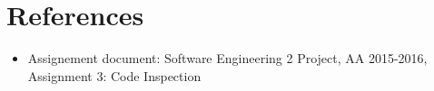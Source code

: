 
\section{References}

\begin{itemize}

\item Assignement document: Software Engineering 2 Project, AA 2015-2016, Assignment 3: Code Inspection
\end{itemize}